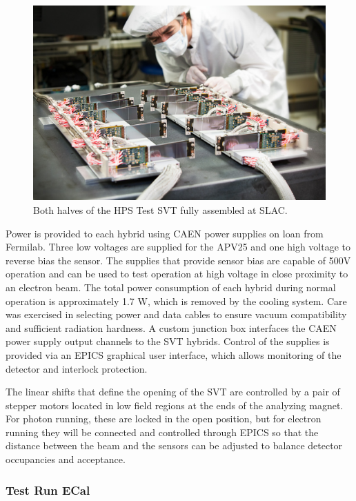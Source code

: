 \begin{figure}[ht]
    \includegraphics[width=\textwidth]{test2012/2012-101-PHOTON-DETECTOR-001.jpg}
\caption{\small{Both halves of the HPS Test SVT fully assembled at SLAC.} }
\label{fig:tracker_halves}
\end{figure}

Power is provided to each hybrid using CAEN power supplies on loan from Fermilab. Three low voltages are supplied for the APV25 and one high voltage to reverse bias the sensor. The supplies that provide sensor bias are capable of 500V operation and can be used to test operation at high voltage in close proximity to an electron beam. The total power consumption of each hybrid during normal operation is approximately 1.7 W, which is removed by the cooling system. Care was exercised in selecting power and data cables to ensure vacuum compatibility and sufficient radiation hardness. A custom junction box interfaces the CAEN power supply output channels to the SVT hybrids. Control of the supplies is provided via an EPICS graphical user interface, which allows monitoring of the detector and interlock protection.

The linear shifts that define the opening of the SVT are controlled by a pair of stepper motors located in low field regions at the ends of the analyzing magnet.  For photon running, these are locked in the open position, but for electron running they will be connected and controlled through EPICS so that the distance between the beam and the sensors can be adjusted to balance detector occupancies and acceptance.

\subsubsection{Test Run ECal}


